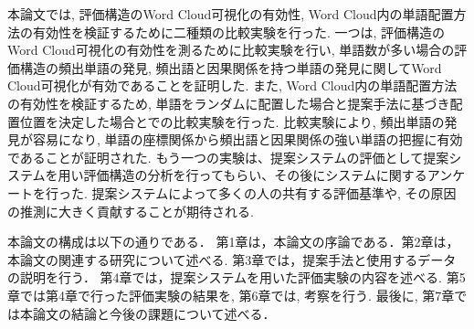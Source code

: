 \documentclass[syuuron]{kuee}
\begin{document}
	本論文では, 評価構造のWord Cloud可視化の有効性, Word Cloud内の単語配置方法の有効性を検証するために二種類の比較実験を行った. 
	一つは, 評価構造のWord Cloud可視化の有効性を測るために比較実験を行い, 
	単語数が多い場合の評価構造の頻出単語の発見, 頻出語と因果関係を持つ単語の発見に関してWord Cloud可視化が有効であることを証明した. 
	また, Word Cloud内の単語配置方法の有効性を検証するため, 単語をランダムに配置した場合と提案手法に基づき配置位置を決定した場合とでの比較実験を行った. 
	比較実験により, 頻出単語の発見が容易になり, 単語の座標関係から頻出語と因果関係の強い単語の把握に有効であることが証明された. 
	もう一つの実験は、提案システムの評価として提案システムを用い評価構造の分析を行ってもらい、その後にシステムに関するアンケートを行った. 
	提案システムによって多くの人の共有する評価基準や, その原因の推測に大きく貢献することが期待される. 

	本論文の構成は以下の通りである．
	第1章は，本論文の序論である．第2章は，本論文の関連する研究について述べる. 第3章では，提案手法と使用するデータの説明を行う．
	第4章では，提案システムを用いた評価実験の内容を述べる. 第5章では第4章で行った評価実験の結果を, 第6章では, 考察を行う. 
	最後に, 第7章では本論文の結論と今後の課題について述べる．
\end{document}
